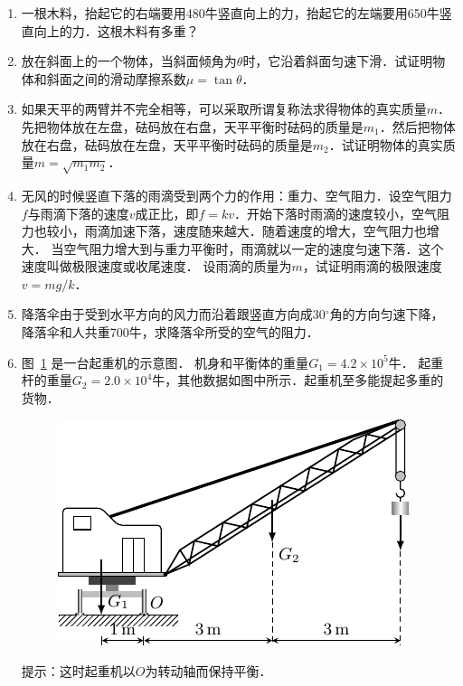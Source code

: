 \begin{enumerate}
\item 一根木料，抬起它的右端要用480牛竖直向上的力，抬起它的左端要用650牛竖直向上的力．这根木料有多重？
\item 放在斜面上的一个物体，当斜面倾角为$\theta$时，它沿着斜面匀速下滑．试证明物体和斜面之间的滑动摩擦系数$\mu=\tan \theta$．
\item 如果天平的两臂并不完全相等，可以采取所谓复称法求得物体的真实质量$m$．先把物体放在左盘，砝码放在右盘，天平平衡时砝码的质量是$m_1$．然后把物体放在右盘，砝码放在左盘，天平平衡时砝码的质量是$m_2$．试证明物体的真实质量$m=\sqrt{m_1m_2}$．
\item 无风的时候竖直下落的雨滴受到两个力的作用：重力、空气阻力．设空气阻力$f$与雨滴下落的速度$v$成正比，即$f=kv$．开始下落时雨滴的速度较小，空气阻力也较小，雨滴加速下落，速度随来越大．随着速度的增大，空气阻力也增大．
当空气阻力增大到与重力平衡时，雨滴就以一定的速度匀速下落．这个速度叫做极限速度或收尾速度．
设雨滴的质量为$m$，试证明雨滴的极限速度$v=mg/k$．
\item 降落伞由于受到水平方向的风力而沿着跟竖直方向成30$^\circ$角的方向匀速下降，降落伞和人共重700牛，求降落伞所受的空气的阻力．
\item 图~\ref{fig_A_6-25} 是一台起重机的示意图．
机身和平衡体的重量$G_1=4.2\times 10^5$牛．
起重杆的重量$G_2=2.0\times 10^4$牛，其他数据如图中所示．起重机至多能提起多重的货物．
\begin{figure}[htbp]
    \centering
    \includegraphics{fig/A/6-25.pdf}
    \caption{}\label{fig_A_6-25}
\end{figure}
提示：这时起重机以$O$为转动轴而保持平衡．


\end{enumerate}
